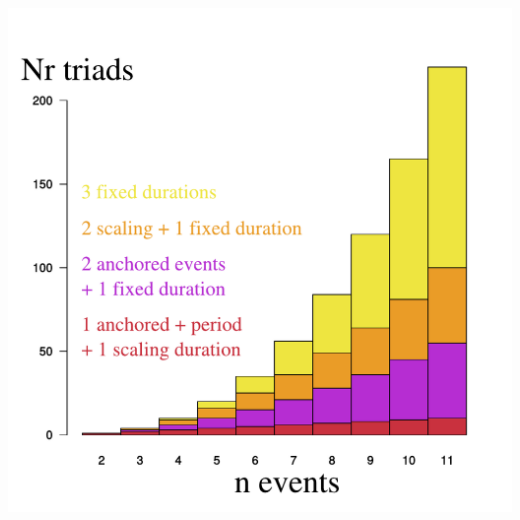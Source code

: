 \documentclass[20pt]{beamer}
\begin{document}

\begin{frame}[plain]

\begin{center}
\includegraphics[scale=1]{Figures/id3compmarked.pdf}
\end{center}

\end{frame}

\end{document}
